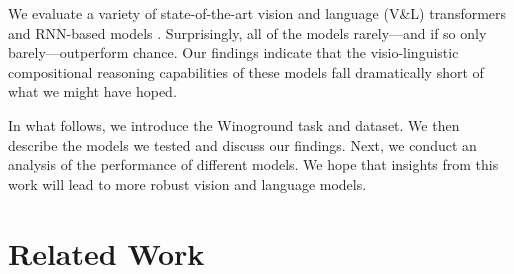 \documentclass[10pt,twocolumn,letterpaper]{article}
\begin{document}
We evaluate a variety of state-of-the-art vision and language (V\&L) transformers \cite{gan2020villa,li2019visualbert,lu2019vilbert,hu2021unit,chen2020uniter,tan2020lxmert,radford2021clip,zhang2021vinvl,kim2021vilt,singh2022flava} and RNN-based models \cite{faghri2018vse,li2019vsrn}. Surprisingly,
all of the models rarely---and if so only barely---outperform chance. Our findings indicate that the visio-linguistic compositional reasoning capabilities of these models fall dramatically short of what we might have hoped.

In what follows, we introduce the Winoground task and dataset. We then describe the models we tested and discuss our findings. Next, we conduct an analysis of the performance of different models. We hope that insights from this work will lead to more robust vision and language models.

\section{Related Work}
\end{document}
